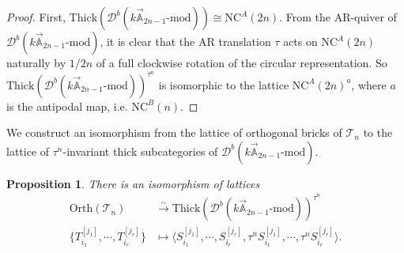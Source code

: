 \documentclass[a4paper, 11pt, reqno]{amsart}
\numberwithin{equation}{section}
\newtheorem{prop}[thm]{Proposition}
\theoremstyle{remark}
\theoremstyle{definition}
\begin{document}
\begin{proof}
   First, $\mathrm{Thick}(\mathcal D^b(k \vec{\mathbb A}_{2n-1} \text{-} \mathrm{mod})) \cong \mathrm{NC}^A(2n)$. From the AR-quiver of $\mathcal D^b(k \vec{\mathbb A}_{2n-1} \text{-} \mathrm{mod})$, it is clear that the AR translation $\tau$ acts on $\mathrm{NC}^A(2n)$ naturally by $1/2n$ of a full clockwise rotation of the circular representation. So $\mathrm{Thick}(\mathcal D^b(k \vec{\mathbb A}_{2n-1} \text{-} \mathrm{mod}))^{\tau ^n}$ is isomorphic to the lattice $\mathrm{NC}^A(2n)^a$, where $a$ is the antipodal map, i.e. $\mathrm{NC}^B(n)$. 
\end{proof}

We construct an isomorphism from the lattice of orthogonal bricks of $\mathcal T_n$ to the lattice of $\tau ^n$-invariant thick subcategories of $\mathcal D^b(k \vec{\mathbb A}_{2n-1} \text{-} \mathrm{mod})$.



\begin{prop} \label{prop orth Tn to Thick Db}
   There is an isomorphism of lattices
   \begin{align*}
      \mathrm{Orth}(\mathcal T_n) &\xrightarrow{\sim} \mathrm{Thick}(\mathcal D^b(k \vec{\mathbb A}_{2n-1} \text{-} \mathrm{mod}))^{\tau ^n} \\
      \{T_{i_1}^{[j_1]},\cdots,T_{i_r}^{[j_r]} \} &\mapsto \langle S_{i_1}^{[j_1]},\cdots,S_{i_r}^{[j_r]},\tau ^n S_{i_1}^{[j_1]},\cdots, \tau ^n S_{i_r}^{[j_r]}\rangle.
   \end{align*}
\end{prop}
\end{document}
